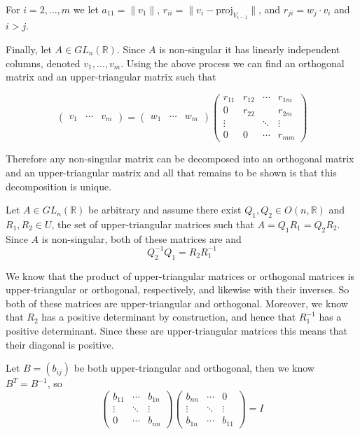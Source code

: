 \documentclass[11pt]{article}
\begin{document}
\begin{enumerate}
For $i=2, \ldots, m$ we let $a_{11} = \|v_1\|$, $r_{ii} = \|v_i - \mbox{proj}_{V_{i-1}}\|$, and $r_{ji} = w_j \cdot v_i$ and $i > j$.

Finally, let $A \in GL_n(\mathbb{R})$.  Since $A$ is non-singular it has linearly independent columns, denoted $v_1, \ldots, v_m$.  Using the above process we can find an orthogonal matrix and an upper-triangular matrix such that

\[
\left(\begin{array}{ccc}v_1 & \cdots & v_m \end{array}\right) = \left(\begin{array}{ccc}w_1 & \cdots &w_m \end{array}\right)
\left(
\begin{array}{cccc}
r_{11} & r_{12} & \cdots & r_{1m} \\
0 & r_{22} & & r_{2m} \\
\vdots & & \ddots & \vdots \\
0 & 0 & \cdots & r_{mm}
\end{array}
\right)
\]

Therefore any non-singular matrix can be decomposed into an orthogonal matrix and an upper-triangular matrix and all that remains to be shown is that this decomposition is unique.

Let $A \in GL_n(\mathbb{R})$ be arbitrary and assume there exist $Q_1,Q_2 \in O(n, \mathbb{R})$ and $R_1,R_2 \in U$, the set of upper-triangular matrices such that $A=Q_1R_1=Q_2R_2$.  Since $A$ is non-singular, both of these matrices are and
\[
Q_2^{-1}Q_1 = R_2R_1^{-1}
\]

We know that the product of upper-triangular matrices or orthogonal matrices is upper-triangular or orthogonal, respectively, and likewise with their inverses.  So both of these matrices are upper-triangular and orthogonal.  Moreover, we know that $R_2$ has a positive determinant by construction, and hence that $R_1^{-1}$ has a positive determinant.  Since these are upper-triangular matrices this means that their diagonal is positive.

Let $B=(b_{ij})$ be both upper-triangular and orthogonal, then we know $B^T = B^{-1}$, so
\[
\left(
\begin{array}{ccc}
b_{11} & \cdots & b_{1n} \\
\vdots & \ddots & \vdots \\
0 & \cdots & b_{nn}
\end{array}
\right)
\left(
\begin{array}{ccc}
b_{nn} & \cdots & 0 \\
\vdots & \ddots & \vdots \\
b_{1n} & \cdots & b_{11}
\end{array}
\right)
= I
\]


\end{enumerate}
\end{document}
